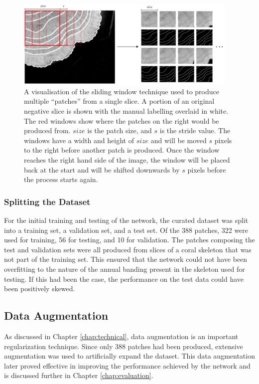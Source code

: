 \begin{figure}[t]
    \centering
    \includegraphics[width=0.95\textwidth]{images/sliding-window.pdf}
    \caption{A visualisation of the sliding window technique used to produce multiple ``patches'' from a single slice. A portion of an original negative slice is shown with the manual labelling overlaid in white. The red windows show where the patches on the right would be produced from. $size$ is the patch size, and $s$ is the stride value. The windows have a width and height of $size$ and will be moved $s$ pixels to the right before another patch is produced. Once the window reaches the right hand side of the image, the window will be placed back at the start and will be shifted downwards by $s$ pixels before the process starts again.}
    \label{fig:slidingwindow}
\end{figure}


\subsubsection{Splitting the Dataset}

For the initial training and testing of the network, the curated dataset was split into a training set, a validation set, and a test set. Of the 388 patches, 322 were used for training, 56 for testing, and 10 for validation. The patches composing the test and validation sets were all produced from slices of a coral skeleton that was not part of the training set. This ensured that the network could not have been overfitting to the nature of the annual banding present in the skeleton used for testing. If this had been the case, the performance on the test data could have been positively skewed.

\subsection{Data Augmentation}

As discussed in Chapter \ref{chap:technical}, data augmentation is an important regularization technique. Since only 388 patches had been produced, extensive augmentation was used to artificially expand the dataset. This data augmentation later proved effective in improving the performance achieved by the network and is discussed further in Chapter \ref{chap:evaluation}.

